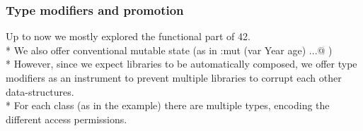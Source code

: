 %
%



\begin{frame}[fragile]
\frametitle{Type modifiers and promotion}
Up to now we mostly explored the functional part of 42.
\\*
We also offer conventional mutable state (as in \Q@Person:{mut (var Year age) ...}@ )
\\*
However, since we expect libraries to be automatically composed, we offer \alert{type modifiers} as an instrument to prevent multiple libraries to corrupt each other data-structures.
\\*
For each class (\Q@Person@ as in the example) there are multiple types, encoding the different access permissions.
\end{frame}


